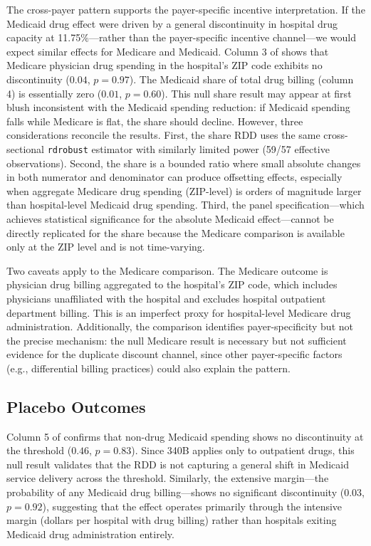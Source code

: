 \documentclass[12pt]{article}
\begin{document}
The cross-payer pattern supports the payer-specific incentive interpretation. If the Medicaid drug effect were driven by a general discontinuity in hospital drug capacity at 11.75\%---rather than the payer-specific incentive channel---we would expect similar effects for Medicare and Medicaid. Column 3 of  shows that Medicare physician drug spending in the hospital's ZIP code exhibits no discontinuity ($0.04$, $p = 0.97$). The Medicaid share of total drug billing (column 4) is essentially zero ($0.01$, $p = 0.60$). This null share result may appear at first blush inconsistent with the Medicaid spending reduction: if Medicaid spending falls while Medicare is flat, the share should decline. However, three considerations reconcile the results. First, the share RDD uses the same cross-sectional \texttt{rdrobust} estimator with similarly limited power (59/57 effective observations). Second, the share is a bounded ratio where small absolute changes in both numerator and denominator can produce offsetting effects, especially when aggregate Medicare drug spending (ZIP-level) is orders of magnitude larger than hospital-level Medicaid drug spending. Third, the panel specification---which achieves statistical significance for the absolute Medicaid effect---cannot be directly replicated for the share because the Medicare comparison is available only at the ZIP level and is not time-varying.

Two caveats apply to the Medicare comparison. The Medicare outcome is physician drug billing aggregated to the hospital's ZIP code, which includes physicians unaffiliated with the hospital and excludes hospital outpatient department billing. This is an imperfect proxy for hospital-level Medicare drug administration. Additionally, the comparison identifies payer-specificity but not the precise mechanism: the null Medicare result is necessary but not sufficient evidence for the duplicate discount channel, since other payer-specific factors (e.g., differential billing practices) could also explain the pattern.


\subsection{Placebo Outcomes}

Column 5 of  confirms that non-drug Medicaid spending shows no discontinuity at the threshold ($0.46$, $p = 0.83$). Since 340B applies only to outpatient drugs, this null result validates that the RDD is not capturing a general shift in Medicaid service delivery across the threshold. Similarly, the extensive margin---the probability of any Medicaid drug billing---shows no significant discontinuity ($0.03$, $p = 0.92$), suggesting that the effect operates primarily through the intensive margin (dollars per hospital with drug billing) rather than hospitals exiting Medicaid drug administration entirely.
\end{document}
